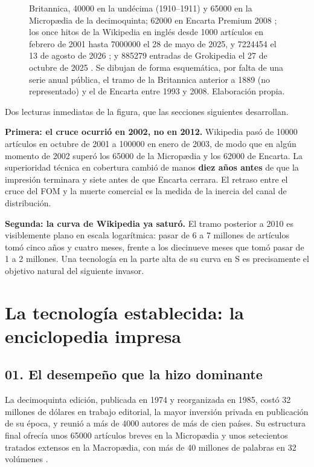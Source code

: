 \documentclass[11pt,letterpaper]{article}
\begin{document}
\begin{figure}[ht]
{  Britannica, \num{40000} en la undécima (1910--1911) y \num{65000} en la
  Micropædia de la decimoquinta; \num{62000} en Encarta Premium 2008
  \parencite{encartawiki}; los once hitos de la Wikipedia en inglés desde
  \num{1000} artículos en febrero de 2001 hasta \num{7000000} el 28 de mayo de
  2025, y \num{7224454} el 13 de agosto de 2026 \parencite{wikistats2026}; y
  \num{885279} entradas de Grokipedia el 27 de octubre de 2025
  \parencite{yasseri2025}. Se dibujan de forma esquemática, por falta de una
  serie anual pública, el tramo de la Britannica anterior a 1889 (no
  representado) y el de Encarta entre 1993 y 2008. Elaboración propia.}
  \label{fig:curvas}
\end{figure}

Dos lecturas inmediatas de la figura, que las secciones siguientes desarrollan.

\textbf{Primera: el cruce ocurrió en 2002, no en 2012.} Wikipedia pasó de
\num{10000} artículos en octubre de 2001 a \num{100000} en enero de 2003, de
modo que en algún momento de 2002 superó los \num{65000} de la Micropædia y los
\num{62000} de Encarta. La superioridad técnica en cobertura cambió de manos
\textbf{diez años antes} de que la impresión terminara y siete antes de que
Encarta cerrara. El retraso entre el cruce del FOM y la muerte comercial es la
medida de la inercia del canal de distribución.

\textbf{Segunda: la curva de Wikipedia ya saturó.} El tramo posterior a 2010 es
visiblemente plano en escala logarítmica: pasar de 6 a 7 millones de artículos
tomó cinco años y cuatro meses, frente a los diecinueve meses que tomó pasar de
1 a 2 millones. Una tecnología en la parte alta de su curva en S es
precisamente el objetivo natural del siguiente invasor.

\section{La tecnología establecida: la enciclopedia impresa}

\subsection*{01. El desempeño que la hizo dominante}

La decimoquinta edición, publicada en 1974 y reorganizada en 1985, costó
32 millones de dólares en trabajo editorial, la mayor inversión privada en
publicación de su época, y reunió a más de \num{4000} autores de más de cien
países. Su estructura final ofrecía unos \num{65000} artículos breves en la
Micropædia y unos setecientos tratados extensos en la Macropædia, con más de
40 millones de palabras en 32 volúmenes \parencite{britannica3,evans1997}.
\end{document}
